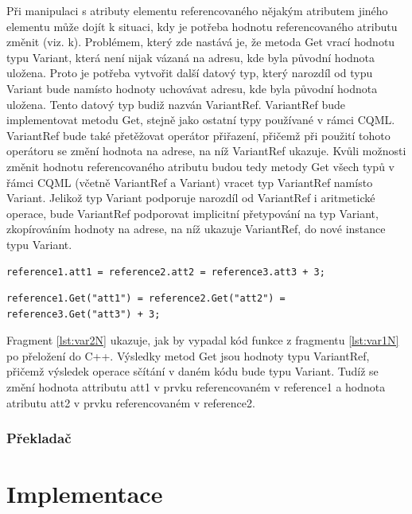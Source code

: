 \documentclass[report,11pt]{elsarticle}
\begin{document}
Při manipulaci s atributy elementu referencovaného nějakým atributem jiného elementu může dojít k situaci, kdy je potřeba hodnotu referencovaného atributu změnit (viz. k). Problémem, který zde nastává je, že metoda Get vrací hodnotu typu Variant, která není nijak vázaná na adresu, kde byla původní hodnota uložena. Proto je potřeba vytvořit další datový typ, který narozdíl od typu Variant bude namísto hodnoty uchovávat adresu, kde byla původní hodnota uložena. Tento datový typ budiž nazván VariantRef. VariantRef bude implementovat metodu Get, stejně jako ostatní typy používané v rámci CQML. VariantRef bude také přetěžovat operátor přiřazení, přičemž při použití tohoto operátoru se změní hodnota na adrese, na níž VariantRef ukazuje. Kvůli možnosti změnit hodnotu referencovaného atributu budou tedy metody Get všech typů v řámci CQML (včetně VariantRef a Variant) vracet typ VariantRef namísto Variant. Jelikož typ Variant podporuje narozdíl od VariantRef i aritmetické operace, bude VariantRef podporovat implicitní přetypování na typ Variant, zkopírováním hodnoty na adrese, na níž ukazuje VariantRef, do nové instance typu Variant.\\


\begin{lstlisting}[frame=single,caption=Řešení v pseudokódu problematického použití operátoru "." v přiřazovacím výroku,label=lst:var1N]
reference1.att1 = reference2.att2 = reference3.att3 + 3;
\end{lstlisting}

\begin{lstlisting}[frame=single,caption=Řešení v pseudokódu problematického použití operátoru "." v přiřazovacím výroku,label=lst:var2N]
reference1.Get("att1") = reference2.Get("att2") = reference3.Get("att3") + 3;
\end{lstlisting}
Fragment \ref{lst:var2N} ukazuje, jak by vypadal kód funkce z fragmentu \ref{lst:var1N} po přeložení do C++. Výsledky metod Get jsou hodnoty typu VariantRef, přičemž výsledek operace sčítání v daném kódu bude typu Variant. Tudíž se změní hodnota attributu att1 v prvku referencovaném v reference1 a hodnota atributu att2 v prvku referencovaném v reference2.\\

\section{\label{SEC:aa}Překladač}




\part{\label{CH:aa}Implementace}
\end{document}
